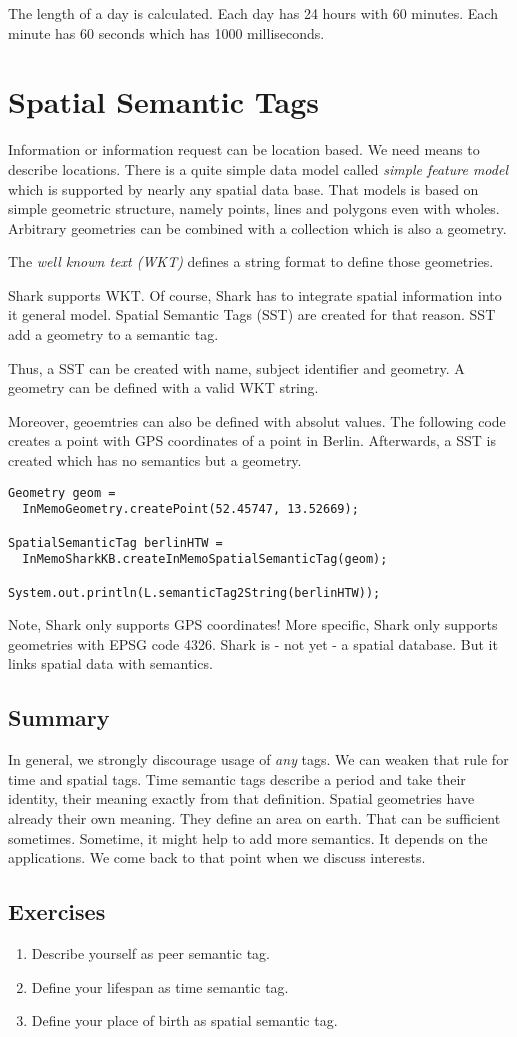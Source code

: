 The length of a day is calculated. Each day has 24 hours with 60 minutes. Each minute has 60 seconds which has 1000 milliseconds.

\section{Spatial Semantic Tags}
Information or information request can be location based. We need means to
describe locations. There is a quite simple data model called {\it simple feature model} which is supported by nearly any spatial data base. That
models is based on simple geometric structure, namely points, lines and polygons even with wholes. Arbitrary geometries can be combined with a collection which is also a geometry.

The {\it well known text (WKT)} defines a string format to define those geometries.

Shark supports WKT. Of course, Shark has to integrate spatial information into it general model. Spatial Semantic Tags (SST) are created for that reason. 
SST add a geometry to a semantic tag.

Thus, a SST can be created with name, subject identifier and geometry.
A geometry can be defined with a valid WKT string.

Moreover, geoemtries can also be defined with absolut values.
The following code creates a point with GPS coordinates of a point in Berlin.
Afterwards, a SST is created which has no semantics but a geometry.

\begin{verbatim}
Geometry geom = 
  InMemoGeometry.createPoint(52.45747, 13.52669);

SpatialSemanticTag berlinHTW = 
  InMemoSharkKB.createInMemoSpatialSemanticTag(geom);

System.out.println(L.semanticTag2String(berlinHTW));
\end{verbatim}

Note, Shark only supports GPS coordinates! More specific, Shark only supports geometries with EPSG code 4326. Shark is - not yet - a spatial database. But it links spatial data with semantics.

\subsection{Summary}
In general, we strongly discourage usage of {\it any} tags. We can weaken that rule for time and spatial tags. Time semantic tags describe a period and 
take their identity, their meaning exactly from that definition. 
Spatial geometries have already their own meaning. They define an area on earth. That can be sufficient sometimes. Sometime, it might help to add more semantics. It depends on the applications. We come back to that point when we discuss interests.

\subsection{Exercises}
\begin{enumerate}
\item 
Describe yourself as peer semantic tag.
\item 
Define your lifespan as time semantic tag.
\item 
Define your place of birth as spatial semantic tag.
\end{enumerate}
